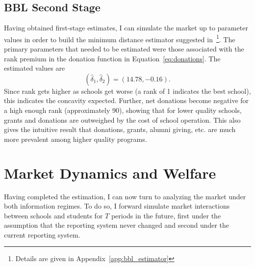 \documentclass[12pt]{article}
\theoremstyle{definition}
\begin{document}





\subsection{BBL Second Stage}

Having obtained first-stage estimates, I can simulate the market up to parameter values in order to build the minimum distance estimator suggested in~\cite{BBL}\footnote{Details are given in Appendix~\ref{app:bbl_estimator}}. The primary parameters that needed to be estimated were those associated with the rank premium in the donation function in Equation~\eqref{eq:donations}. The estimated values are
\begin{equation}
  (\hat{\delta}_1, \hat{\delta}_2) = (14.78, -0.16).
\end{equation}
Since rank gets higher as schools get worse (a rank of 1 indicates the best school), this indicates the concavity expected. Further, net donations become negative for a high enough rank (approximately 90), showing that for lower quality schools, grants and donations are outweighed by the cost of school operation. This also gives the intuitive result that donations, grants, alumni giving, etc. are much more prevalent among higher quality programs.


\section{Market Dynamics and Welfare}

Having completed the estimation, I can now turn to analyzing the market under both information regimes. To do so, I forward simulate market interactions between schools and students for $T$ periods in the future, first under the assumption that the reporting system never changed and second under the current reporting system.
\end{document}
